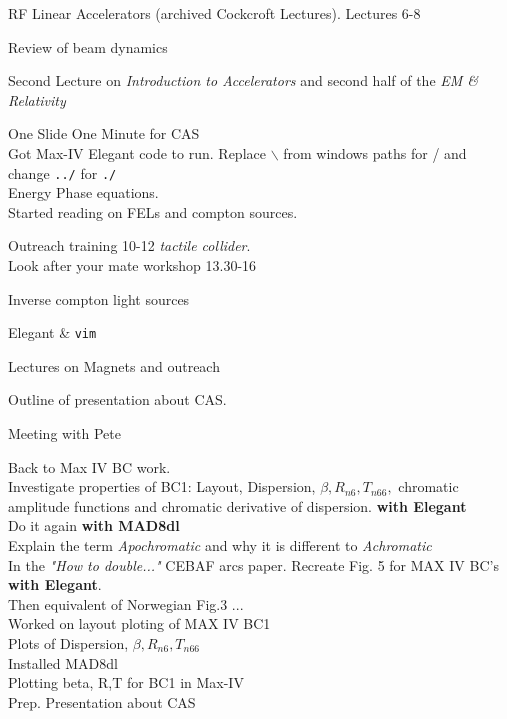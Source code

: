 
RF Linear Accelerators (archived Cockcroft Lectures). Lectures 6-8\\



Review of beam dynamics



Second Lecture on \textit{Introduction to Accelerators} and second half of the \textit{EM \& Relativity}



One Slide One Minute for CAS\\
Got Max-IV Elegant code to run. Replace $\backslash$ from windows paths for / and change \verb|../| for \verb|./|\\ 
Energy Phase equations.\\
Started reading on FELs and compton sources.


Outreach training 10-12 \textit{tactile collider}.\\
Look after your mate workshop 13.30-16\\


Inverse compton light sources


Elegant \& \verb|vim|


Lectures on Magnets and outreach


Outline of presentation about CAS.

Meeting with Pete

Back to Max IV BC work.\\
Investigate properties of BC1: Layout, Dispersion, $\beta, R_{n6}, T_{n66},$ chromatic amplitude functions and chromatic derivative of dispersion. \textbf{with Elegant}\\
Do it again \textbf{with MAD8dl}\\
Explain the term \textit{Apochromatic} and why it is different to \textit{Achromatic}\\
In the \textit{"How to double..."} CEBAF arcs paper. Recreate Fig. 5 for MAX IV BC's \textbf{with Elegant}.\\
Then equivalent of Norwegian Fig.3 ...\\

Worked on layout ploting of MAX IV BC1\\
Plots of Dispersion, $\beta, R_{n6}, T_{n66}$\\

Installed MAD8dl\\

Plotting beta, R,T for BC1 in Max-IV\\
Prep. Presentation about CAS\\

